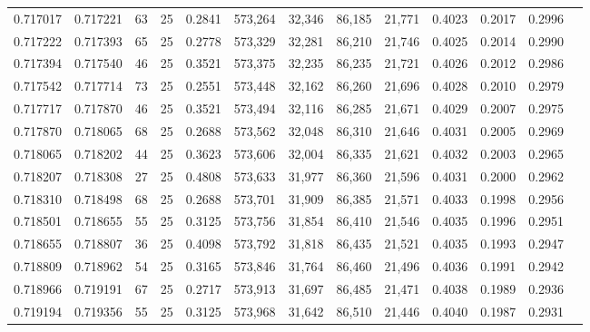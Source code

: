 \begin{tabular}{rrrrrrrrrrrrr}
0.717017 & 0.717221 &    63 &  25 &                                     0.2841 & 573,264 &  32,346 &  86,185 &  21,771 & 0.4023 & 0.2017 & 0.2996 \\
0.717222 & 0.717393 &    65 &  25 &                                     0.2778 & 573,329 &  32,281 &  86,210 &  21,746 & 0.4025 & 0.2014 & 0.2990 \\
0.717394 & 0.717540 &    46 &  25 &                                     0.3521 & 573,375 &  32,235 &  86,235 &  21,721 & 0.4026 & 0.2012 & 0.2986 \\
0.717542 & 0.717714 &    73 &  25 &                                     0.2551 & 573,448 &  32,162 &  86,260 &  21,696 & 0.4028 & 0.2010 & 0.2979 \\
0.717717 & 0.717870 &    46 &  25 &                                     0.3521 & 573,494 &  32,116 &  86,285 &  21,671 & 0.4029 & 0.2007 & 0.2975 \\
0.717870 & 0.718065 &    68 &  25 &                                     0.2688 & 573,562 &  32,048 &  86,310 &  21,646 & 0.4031 & 0.2005 & 0.2969 \\
0.718065 & 0.718202 &    44 &  25 &                                     0.3623 & 573,606 &  32,004 &  86,335 &  21,621 & 0.4032 & 0.2003 & 0.2965 \\
0.718207 & 0.718308 &    27 &  25 &                                     0.4808 & 573,633 &  31,977 &  86,360 &  21,596 & 0.4031 & 0.2000 & 0.2962 \\
0.718310 & 0.718498 &    68 &  25 &                                     0.2688 & 573,701 &  31,909 &  86,385 &  21,571 & 0.4033 & 0.1998 & 0.2956 \\
0.718501 & 0.718655 &    55 &  25 &                                     0.3125 & 573,756 &  31,854 &  86,410 &  21,546 & 0.4035 & 0.1996 & 0.2951 \\
0.718655 & 0.718807 &    36 &  25 &                                     0.4098 & 573,792 &  31,818 &  86,435 &  21,521 & 0.4035 & 0.1993 & 0.2947 \\
0.718809 & 0.718962 &    54 &  25 &                                     0.3165 & 573,846 &  31,764 &  86,460 &  21,496 & 0.4036 & 0.1991 & 0.2942 \\
0.718966 & 0.719191 &    67 &  25 &                                     0.2717 & 573,913 &  31,697 &  86,485 &  21,471 & 0.4038 & 0.1989 & 0.2936 \\
0.719194 & 0.719356 &    55 &  25 &                                     0.3125 & 573,968 &  31,642 &  86,510 &  21,446 & 0.4040 & 0.1987 & 0.2931 \\

\end{tabular}
